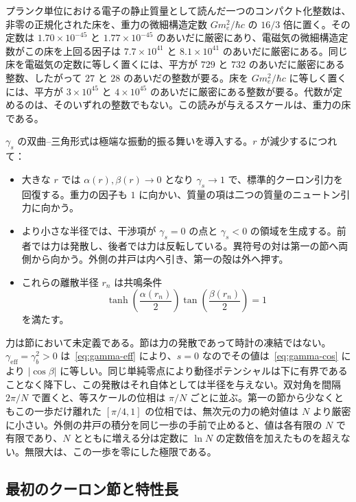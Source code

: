 \documentclass[a4paper]{article}
\begin{document}
プランク単位における電子の静止質量として読んだ一つのコンパクト化整数は、非零の正規化された床を、重力の微細構造定数 \(G m_e^2/\hbar c\) の \(16/3\) 倍に置く。その定数は \(1.70\times 10^{-45}\) と \(1.77\times 10^{-45}\) のあいだに厳密にあり、電磁気の微細構造定数がこの床を上回る因子は \(7.7\times 10^{41}\) と \(8.1\times 10^{41}\) のあいだに厳密にある。同じ床を電磁気の定数に等しく置くには、平方が \(729\) と \(732\) のあいだに厳密にある整数、したがって \(27\) と \(28\) のあいだの整数が要る。床を \(G m_e^2/\hbar c\) に等しく置くには、平方が \(3\times 10^{45}\) と \(4\times 10^{45}\) のあいだに厳密にある整数が要る。代数が定めるのは、そのいずれの整数でもない。この読みが与えるスケールは、重力の床である。

\(\gamma_s\) の双曲--三角形式は極端な振動的振る舞いを導入する。\(r\) が減少するにつれて：

\begin{itemize}
  \item 大きな \(r\) では \(\alpha(r),\beta(r) \to 0\) となり \(\gamma_s \to 1\) で、標準的クーロン引力を回復する。重力の因子も \(1\) に向かい、質量の項は二つの質量のニュートン引力に向かう。
  \item より小さな半径では、干渉項が \(\gamma_s = 0\) の点と \(\gamma_s < 0\) の領域を生成する。前者では力は発散し、後者では力は反転している。異符号の対は第一の節へ両側から向かう。外側の井戸は内へ引き、第一の殻は外へ押す。
  \item これらの離散半径 \(r_n\) は共鳴条件
  \[
  \tanh\!\left(\frac{\alpha(r_n)}{2}\right) \tan\!\left(\frac{\beta(r_n)}{2}\right) = 1
  \]
  を満たす。
\end{itemize}

力は節において未定義である。節は力の発散であって時計の凍結ではない。\(\gamma_{\mathrm{eff}}=\gamma_b^2>0\) は~\eqref{eq:gamma-eff} により、\(s=0\) なのでその値は~\eqref{eq:gamma-cos} により \(|\cos\beta|\) に等しい。同じ単純零点により動径ポテンシャルは下に有界であることなく降下し、この発散はそれ自体としては半径を与えない。双対角を間隔 \(2\pi/N\) で置くと、等スケールの位相は \(\pi/N\) ごとに並ぶ。第一の節から少なくともこの一歩だけ離れた \([\pi/4,1]\) の位相では、無次元の力の絶対値は \(N\) より厳密に小さい。外側の井戸の積分を同じ一歩の手前で止めると、値は各有限の \(N\) で有限であり、\(N\) とともに増える分は定数に \(\ln N\) の定数倍を加えたものを超えない。無限大は、この一歩を零にした極限である。

\subsection{最初のクーロン節と特性長}
\end{document}
